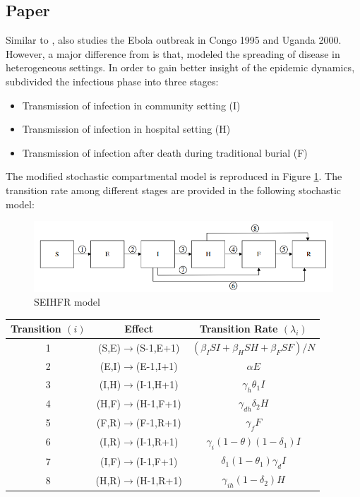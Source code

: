 \documentclass[10pt, journal,onecolumn]{IEEEtran}
\begin{document}
\subsection{\textbf{Paper \citep{legrand2007understanding}}}
Similar to \citep{chowell2004basic}, \citep{legrand2007understanding} also studies the Ebola outbreak in Congo 1995 and Uganda 2000. However, a major difference from \citep{chowell2004basic} is that, \citep{legrand2007understanding} modeled the spreading of disease in heterogeneous settings. In order to gain better insight of the epidemic dynamics, \citep{legrand2007understanding} subdivided the infectious phase into three stages:

\begin{itemize}
\item Transmission of infection in community setting (I)
\item Transmission of infection in hospital setting (H)
\item Transmission of infection after death during traditional burial (F)
\end{itemize}


The modified stochastic compartmental model is reproduced in Figure \ref{fig:SEIHFR_model}. The transition rate among different stages are provided in the following stochastic model:

\begin{figure}[h!]
\centering
\includegraphics[scale=0.5]{seihfr_model_fig}
\caption{SEIHFR model}
\label{fig:SEIHFR_model}
\end{figure}

\begin{center}
\begin{tabular}{|c|c|c|}
\hline 
Transition $(i)$ & Effect & Transition Rate $(\lambda_i)$ \tabularnewline
\hline 
\hline 
1 & (S,E)$\to$(S-1,E+1) & $(\beta_{I}SI+\beta_{H}SH+\beta_{F}SF)/N$\tabularnewline
\hline 
2 & (E,I)$\to$(E-1,I+1) & $\alpha E$\tabularnewline
\hline 
3 & (I,H)$\to$(I-1,H+1) & $\gamma_{h}\theta_{1}I$\tabularnewline
\hline 
4 & (H,F)$\to$(H-1,F+1) & $\gamma_{dh}\delta_{2}H$\tabularnewline
\hline 
5 & (F,R)$\to$(F-1,R+1) & $\gamma_{f}F$\tabularnewline
\hline 
6 & (I,R)$\to$(I-1,R+1) & $\gamma_{i}(1-\theta)(1-\delta_{1})I$\tabularnewline
\hline 
7 & (I,F)$\to$(I-1,F+1) & $\delta_{1}(1-\theta_{1})\gamma_{d}I$\tabularnewline
\hline 
8 & (H,R)$\to$(H-1,R+1) & $\gamma_{ih}(1-\delta_{2})H$\tabularnewline
\hline 
\end{tabular}
\end{center}
\end{document}
